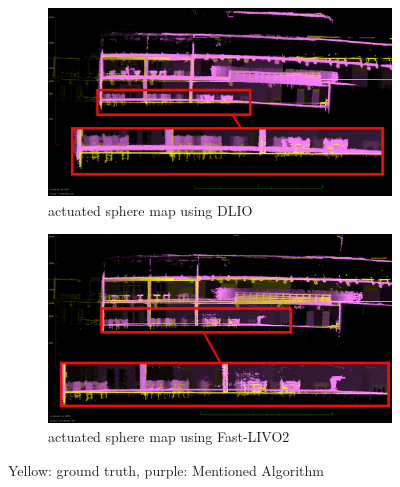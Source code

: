\documentclass[conference]{IEEEtran}
\begin{document}
\begin{figure}[htbp]
\centering
\begin{subfigure}{0.48\columnwidth}
    \centering
    \includegraphics[width=\textwidth]{pics/drifts_bending/dlio_bending.png}
    \caption{actuated sphere map using DLIO}\label{fig:dlio_bending}
    \end{subfigure}
\begin{subfigure}{0.48\columnwidth}
    \centering
    \includegraphics[width=\textwidth]{pics/drifts_bending/livo_actuated_bending.png}
    \caption{actuated sphere map using Fast-LIVO2}\label{fig:livo_bending}
\end{subfigure}
\hfill
\caption{Yellow: ground truth, purple: Mentioned Algorithm}
\label{fig:bending}
\end{figure}
\end{document}
